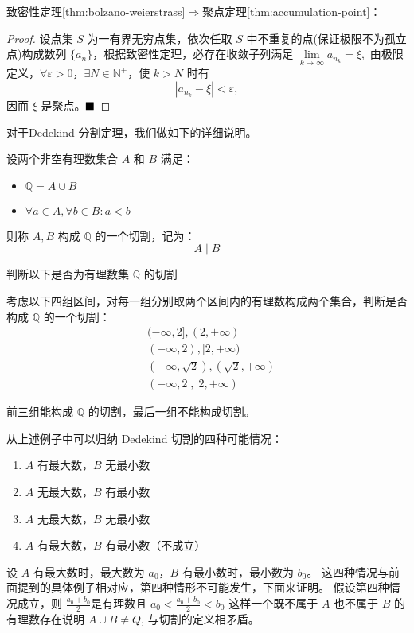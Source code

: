 致密性定理\ref{thm:bolzano-weierstrass}$\Rightarrow$聚点定理\ref{thm:accumulation-point}：
\begin{proof}
    设点集 $S$ 为一有界无穷点集，依次任取 $S$ 中不重复的点(保证极限不为孤立点)构成数列 $\{a_n\}$，根据致密性定理，必存在收敛子列满足 
$\lim\limits_{k \to \infty} a_{n_k} = \xi,$
由极限定义，$\forall \varepsilon > 0$，$\exists N \in \mathbb{N}^+$，使 $k > N$ 时有 
$$|a_{n_k} - \xi| < \varepsilon,$$
因而 $\xi$ 是聚点。$\hfill\blacksquare$
\end{proof}

\newpage 
对于Dedekind 分割定理，我们做如下的详细说明。
    \begin{definition}[有理数集的切割]
    设两个非空有理数集合 $A$ 和 $B$ 满足：

    \begin{itemize}
    \item $ \mathbb{Q} = A \cup B $
    \item $ \forall a \in A, \forall b \in B: a < b $
    \end{itemize}

    则称 $A, B$ 构成 $\mathbb{Q}$ 的一个切割，记为：
    \[
    A \mid B
    \]
    \end{definition}
    \begin{example}
    判断以下是否为有理数集 $\mathbb{Q}$ 的切割

    考虑以下四组区间，对每一组分别取两个区间内的有理数构成两个集合，判断是否构成 $\mathbb{Q}$ 的一个切割：
    \begin{align*}
    & (-\infty, 2] , (2, +\infty) \\
    & (-\infty, 2) , [2, +\infty) \\
    & (-\infty, \sqrt{2}) , (\sqrt{2}, +\infty) \\
    & (-\infty, 2] , [2, +\infty)
    \end{align*}

    前三组能构成 $\mathbb{Q}$ 的切割，最后一组不能构成切割。
    \end{example}
    
    \begin{remark}
        从上述例子中可以归纳 Dedekind 切割的四种可能情况：

        \begin{enumerate}
        \item $A$ 有最大数，$B$ 无最小数
        \item $A$ 无最大数，$B$ 有最小数
        \item $A$ 无最大数，$B$ 无最小数
        \item $A$ 有最大数，$B$ 有最小数（不成立）
        \end{enumerate}

        设 \( A \) 有最大数时，最大数为 \( a_0 \)，\( B \) 有最小数时，最小数为 \( b_0 \)。
        这四种情况与前面提到的具体例子相对应，第四种情形不可能发生，下面来证明。
        假设第四种情况成立，则 $\frac{a_0 + b_0}{2}$是有理数且  
        $a_0 < \frac{a_0 + b_0}{2} < b_0$
        这样一个既不属于 \( A \) 也不属于 \( B \) 的有理数存在说明  
        $A \cup B \neq Q$,
        与切割的定义相矛盾。
    \end{remark}    

